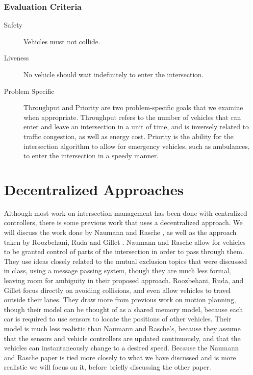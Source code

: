 \documentclass[12pt]{article}
\begin{document}
\subsubsection{Evaluation Criteria}

\begin{description}
\item[Safety] Vehicles must not collide.  
\item[Liveness] No vehicle should wait indefinitely to enter the intersection.
\item[Problem Specific]
Throughput and Priority are two problem-specific goals that we examine when appropriate. Throughput refers to the number of vehicles that can enter and leave an intersection in a unit of time, and is inversely related to traffic congestion, as well as energy cost. Priority is the ability for the intersection algorithm to allow for emergency vehicles, such as ambulances, to enter the intersection in a speedy manner.
\end{description}

\section{Decentralized Approaches}
\label{sec:decentralizedApproaches}
Although most work on intersection management has been done with centralized controllers, there is some previous work that uses a decentralized approach. We will discuss the work done by Naumann and Rasche \cite{naumann}, as well as the approach taken by Roozbehani, Ruda and Gillet \cite{roozbehani}. Naumann and Rasche allow for vehicles to be granted control of parts of the intersection in order to pass through them. They use ideas closely related to the mutual exclusion topics that were discussed in class, using a message passing system, though they are much less formal, leaving room for ambiguity in their proposed approach. Roozbehani, Ruda, and Gillet focus directly on avoiding collisions, and even allow vehicles to travel outside their lanes. They draw more from previous work on motion planning, though their model can be thought of as a shared memory model, because each car is required to use sensors to locate the positions of other vehicles. Their model is much less realistic than Naumann and Rasche's, because they assume that the sensors and vehicle controllers are updated continuously, and that the vehicles can instantaneously change to a desired speed. Because the Naumann and Rasche paper is tied more closely to what we have discussed and is more realistic we will focus on it, before briefly discussing the other paper. 
\end{document}
